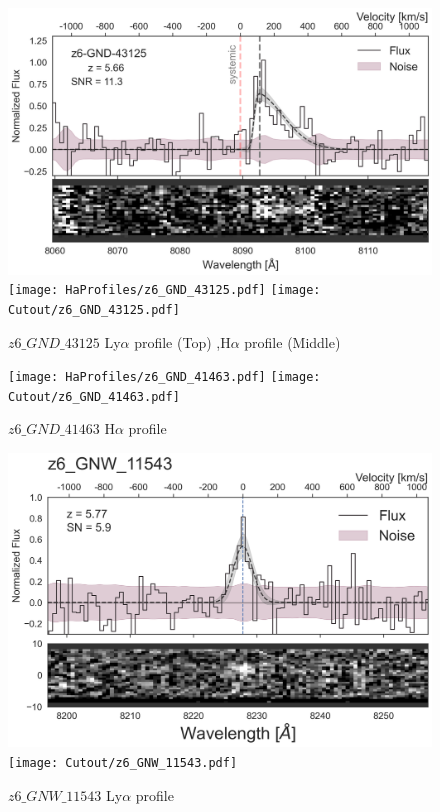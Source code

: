 \documentclass[12pt,english]{article}
\begin{document}
\clearpage
\begin{figure}
\begin{center}\includegraphics[width=12cm, trim=0.1cm 0cm 0cm -1cm]{LyaProfiles/z6_GND_43125.png}
\texttt{[image: HaProfiles/z6\_GND\_43125.pdf]}
\texttt{[image: Cutout/z6\_GND\_43125.pdf]}
\caption{$z6\_GND\_43125$ Ly$\alpha$ profile (Top) ,H$\alpha$ profile (Middle)}
\end{center}
\end{figure}
\clearpage
\begin{figure}
\begin{center}\texttt{[image: HaProfiles/z6\_GND\_41463.pdf]}
\texttt{[image: Cutout/z6\_GND\_41463.pdf]}
\caption{$z6\_GND\_41463$ H$\alpha$ profile}
\end{center}
\end{figure}
\clearpage
\begin{figure}
\begin{center}\includegraphics[width=12cm, trim=0.1cm 0cm 0cm -1cm]{LyaProfiles/z6_GNW_11543.png}
\texttt{[image: Cutout/z6\_GNW\_11543.pdf]}
\caption{$z6\_GNW\_11543$ Ly$\alpha$ profile}
\end{center}
\end{figure}
\end{document}
